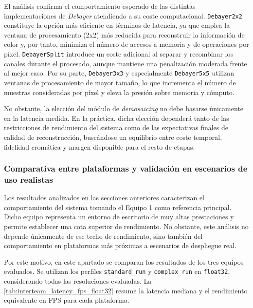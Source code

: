 \newpage

El análisis confirma el comportamiento esperado de las distintas
implementaciones de \textit{Debayer} atendiendo a su coste computacional.
\texttt{Debayer2x2} constituye la opción más eficiente en términos de latencia, ya que
emplea la ventana de procesamiento (2x2) más reducida para reconstruir la información de color
y, por tanto, minimiza el número de accesos a memoria y de operaciones por píxel.
\texttt{DebayerSplit} introduce un coste adicional al separar y recombinar los canales
durante el procesado, aunque mantiene una penalización moderada frente al mejor caso.
Por su parte, \texttt{Debayer3x3} y especialmente \texttt{Debayer5x5} utilizan
ventanas de procesamiento de mayor tamaño, lo que incrementa el número de muestras
consideradas por píxel y eleva la presión sobre memoria y cómputo.

No obstante, la elección del módulo de \textit{demosaicing} no debe basarse únicamente en la latencia medida.
En la práctica, dicha elección dependerá tanto de las restricciones de rendimiento del sistema como
de las expectativas finales de calidad de reconstrucción, buscándose un equilibrio entre coste
temporal, fidelidad cromática y margen disponible para el resto de etapas.

\newpage

\subsubsection{Comparativa entre plataformas y validación en escenarios de uso realistas} \label{subsubsec:platform_comparison_results}

Los resultados analizados en las secciones anteriores caracterizan el comportamiento
del sistema tomando el Equipo 1 como referencia principal. Dicho equipo representa un
entorno de escritorio de muy altas prestaciones y permite establecer una cota superior de
rendimiento. No obstante, este análisis no depende únicamente de ese
techo de rendimiento, sino también del comportamiento en plataformas más próximas a
escenarios de despliegue real.

Por este motivo, en este apartado se comparan los resultados de los
tres equipos evaluados. Se utilizan los perfiles \texttt{standard\_run} y
\texttt{complex\_run} en \texttt{float32}, considerando todas las resoluciones
evaluadas. La \autoref{tab:interteam_latency_fps_float32} resume la latencia mediana y
el rendimiento equivalente en FPS para cada plataforma.



